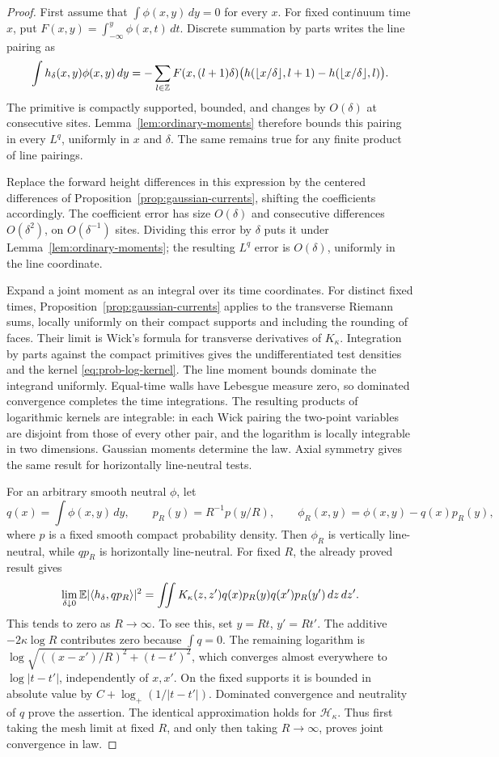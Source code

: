 \begin{proof}
First assume that \(\int\phi(x,y)\,dy=0\) for every \(x\).
For fixed continuum time \(x\), put
\(F(x,y)=\int_{-\infty}^y\phi(x,t)\,dt\).
Discrete summation by parts writes the line pairing as
\[
 \int h_\delta(x,y)\phi(x,y)\,dy
 =-\sum_{l\in\mathbb Z}F(x,(l+1)\delta)
       \bigl(h(\lfloor x/\delta\rfloor,l+1)
             -h(\lfloor x/\delta\rfloor,l)\bigr).
\]
The primitive is compactly supported, bounded, and changes by \(O(\delta)\)
at consecutive sites. Lemma~\ref{lem:ordinary-moments} therefore bounds
this pairing in every \(L^q\), uniformly in \(x\) and \(\delta\).
The same remains true for any finite product of line pairings.

Replace the forward height differences in this expression by the
centered differences of Proposition~\ref{prop:gaussian-currents}, shifting
the coefficients accordingly. The coefficient error has size
\(O(\delta)\) and consecutive differences \(O(\delta^2)\), on
\(O(\delta^{-1})\) sites. Dividing this error by \(\delta\) puts it
under Lemma~\ref{lem:ordinary-moments}; the resulting \(L^q\) error is
\(O(\delta)\), uniformly in the line coordinate.

Expand a joint moment as an integral over its time coordinates.
For distinct fixed times, Proposition~\ref{prop:gaussian-currents}
applies to the transverse Riemann sums, locally uniformly on their
compact supports and including the rounding of faces. Their limit is
Wick's formula for transverse derivatives of \(K_\kappa\).
Integration by parts against the compact primitives gives the
undifferentiated test densities and the kernel
\eqref{eq:prob-log-kernel}. The line moment bounds dominate the integrand
uniformly. Equal-time walls have Lebesgue measure zero, so dominated
convergence completes the time integrations. The resulting products of
logarithmic kernels are integrable: in each Wick pairing the two-point
variables are disjoint from those of every other pair, and the logarithm
is locally integrable in two dimensions. Gaussian moments determine the
law. Axial symmetry gives the same result for horizontally line-neutral
tests.

For an arbitrary smooth neutral \(\phi\), let
\[
 q(x)=\int\phi(x,y)\,dy,\qquad
 p_R(y)=R^{-1}p(y/R),\qquad
 \phi_R(x,y)=\phi(x,y)-q(x)p_R(y),
\]
where \(p\) is a fixed smooth compact probability density.
Then \(\phi_R\) is vertically line-neutral, while \(q p_R\) is
horizontally line-neutral. For fixed \(R\), the already proved result
gives
\[
 \lim_{\delta\downarrow0}\mathbb E|\langle h_\delta,q p_R\rangle|^2
 =\iint K_\kappa(z,z')q(x)p_R(y)q(x')p_R(y')\,dz\,dz'.
\]
This tends to zero as \(R\to\infty\). To see this, set
\(y=Rt\), \(y'=Rt'\). The additive \(-2\kappa\log R\) contributes
zero because \(\int q=0\). The remaining logarithm is
\(\log\sqrt{((x-x')/R)^2+(t-t')^2}\), which converges almost everywhere
to \(\log|t-t'|\), independently of \(x,x'\).
On the fixed supports it is bounded in absolute value by
\(C+\log_+(1/|t-t'|)\). Dominated convergence and neutrality of \(q\)
prove the assertion. The identical approximation holds for
\(\mathcal H_\kappa\). Thus first taking the mesh limit at fixed \(R\),
and only then taking \(R\to\infty\), proves joint convergence in law.


\end{proof}

